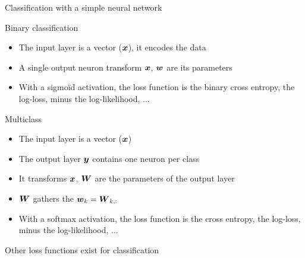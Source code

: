 \begin{frame}{Classification with a simple neural network}
  \begin{block}{Binary classification}
    \begin{itemize}
    \item The input layer is a vector ($\boldsymbol{x}$), it encodes the data
    \item A single output neuron transform $\boldsymbol{x}$,  $\boldsymbol{w}$ are its parameters
    \item With a sigmoïd activation, the loss function is the binary cross entropy, the log-loss,
      minus the log-likelihood, ...
    \end{itemize}
  \end{block}
  \begin{block}{Multiclass}
    \begin{itemize}
    \item The input layer is a vector ($\boldsymbol{x}$) 
    \item The output layer $\boldsymbol{y}$ contains one neuron per class  
    \item It transforms $\boldsymbol{x}$, $\boldsymbol{W}$ are the parameters of the output layer
    \item $\boldsymbol{W}$ gathers the $\boldsymbol{w}_k= \boldsymbol{W}_{k,:}$
    \item With a softmax activation, the loss function is the cross entropy, the log-loss,
      minus the log-likelihood, ...
    \end{itemize}
  \end{block}
  \begin{center}
    {\color{red} Other loss functions exist for classification}
  \end{center}
\end{frame}

